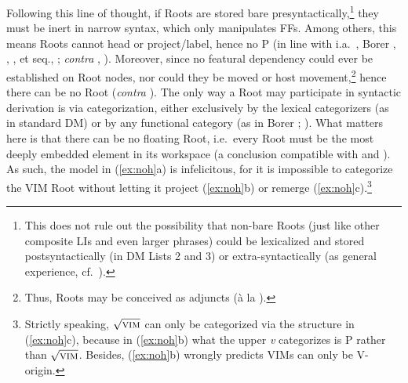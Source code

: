 \documentclass[output=paper]{langsci/langscibook}
\begin{document}
Following this line of thought, if Roots are stored bare
presyntactically,\footnote{This does not rule out the possibility that non-bare
Roots (just like other composite LIs and even larger phrases) could be
lexicalized and stored postsyntactically (in \gls{DM} Lists 2 and 3) or
extra-syntactically (as general experience, cf.\ \citealt{Marantz2013}).} they
must be inert in narrow syntax, which only manipulates FFs. Among others, this
means Roots cannot head or project/label, hence no {\textsurd}P (in line with
i.a.\ \citealt{Acquaviva2009}, Borer \citeyear{Borer2009}, \citeyear{Borer2014},
\citealt{Chomsky2013}, \citealt{deBelder2011} et seq., \citealt{Alexiadou2014};
\emph{contra} \citealt{Cuervo2014}, \citealt{Harley2014}). Moreover, since no featural
dependency could ever be established on Root nodes, nor could they be moved or
host movement,\footnote{Thus, Roots may be conceived as adjuncts (\`{a} la
\citealt{Marantz2013}).} hence there can be no Root  (\emph{contra}
\citealt{Harley2009}). The only way a Root may participate in syntactic
derivation is via categorization, either exclusively by the lexical
categorizers (as in standard \gls{DM}) or by any functional category (as in
Borer \citeyear{Borer2005,Borer2013}; \citealt{Biberauer2016,Song2017roots}).
What matters here is that there can be no floating Root, i.e.\ every Root must be
the most deeply embedded element in its workspace (a conclusion compatible with
\citealt{Marantz2001b} and \citealt{Boeckx2014}). As such, the model in
(\ref{ex:noh}a) is infelicitous, for it is impossible to categorize the
\gls{VIM} Root without letting it project
(\ref{ex:noh}b) or remerge (\ref{ex:noh}c).\footnote{Strictly speaking,
    $\sqrt{\textrm{\textsc{vim}}}$ can only be categorized via the
     structure in (\ref{ex:noh}c), because in (\ref{ex:noh}b)
    what the upper {\em v} categorizes is {\textsurd}P rather than
    $\sqrt{\textrm{\textsc{vim}}}$.  Besides, (\ref{ex:noh}b) wrongly predicts
\glspl{VIM} can only be V-origin.}
\end{document}
